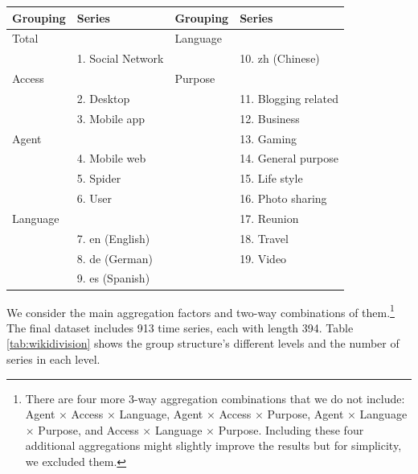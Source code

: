 \documentclass[11pt,a4paper,]{article}
\let\origtable\table
\let\endorigtable\endtable
\renewenvironment{table}[1][2] {
    \expandafter\origtable\expandafter[!htbp]
} {
    \endorigtable
}
\begin{document}
\begin{table}

\caption{\label{tab:wikipediagroupingstructure}Social networking Wikipedia article grouping structure}
\centering
\begin{tabular}[t]{llll}
\toprule
Grouping & Series & Grouping & Series\\
\midrule
Total &  & Language & \\
 & 1. Social Network &  & 10. zh (Chinese)\\
Access &  & Purpose & \\
 & 2. Desktop &  & 11. Blogging related\\
 & 3. Mobile app &  & 12. Business\\
Agent &  &  & 13. Gaming\\
 & 4.  Mobile web &  & 14. General purpose\\
 & 5. Spider &  & 15. Life style\\
 & 6. User &  & 16. Photo sharing\\
Language &  &  & 17. Reunion\\
 & 7. en (English) &  & 18. Travel\\
 & 8. de (German) &  & 19. Video\\
 & 9. es (Spanish) &  & \\
\bottomrule
\end{tabular}
\end{table}

We consider the main aggregation factors and two-way combinations of them.\footnote{There are four more 3-way aggregation combinations that we do not include: Agent \(\times\) Access \(\times\) Language, Agent \(\times\) Access \(\times\) Purpose, Agent \(\times\) Language \(\times\) Purpose, and Access \(\times\) Language \(\times\) Purpose. Including these four additional aggregations might slightly improve the results but for simplicity, we excluded them.} The final dataset includes 913 time series, each with length 394. Table \ref{tab:wikidivision} shows the group structure's different levels and the number of series in each level.
\end{document}
